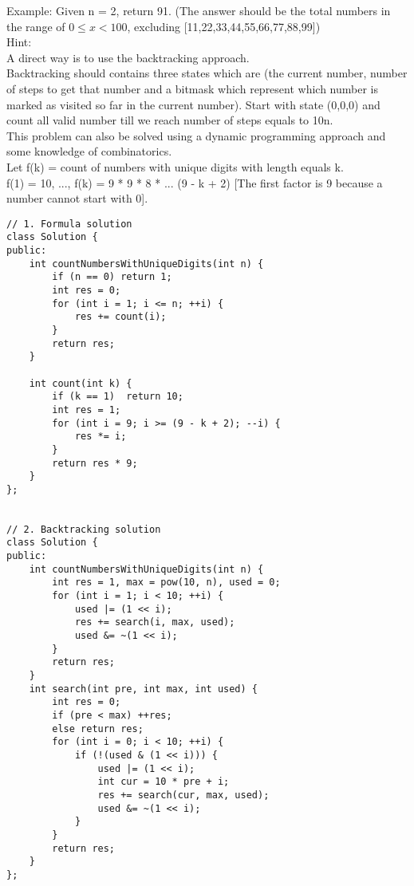Example:
Given n = 2, return 91. (The answer should be the total numbers in the range of $0 \leq x < 100$, excluding [11,22,33,44,55,66,77,88,99]) \\

Hint:\\
    A direct way is to use the backtracking approach.\\
    Backtracking should contains three states which are (the current number, number of steps to get that number and a bitmask which represent which number is marked as visited so far in the current number). Start with state (0,0,0) and count all valid number till we reach number of steps equals to 10n.\\
    This problem can also be solved using a dynamic programming approach and some knowledge of combinatorics.\\
    Let f(k) = count of numbers with unique digits with length equals k.\\
    f(1) = 10, ..., f(k) = 9 * 9 * 8 * ... (9 - k + 2) [The first factor is 9 because a number cannot start with 0].\\

\begin{lstlisting}
// 1. Formula solution
class Solution {
public:
    int countNumbersWithUniqueDigits(int n) {
        if (n == 0) return 1;
        int res = 0;
        for (int i = 1; i <= n; ++i) {
            res += count(i);
        }
        return res;
    }
    
    int count(int k) {
        if (k == 1)  return 10;
        int res = 1;
        for (int i = 9; i >= (9 - k + 2); --i) {
            res *= i;
        }
        return res * 9;
    }
};


// 2. Backtracking solution
class Solution {
public:
    int countNumbersWithUniqueDigits(int n) {
        int res = 1, max = pow(10, n), used = 0;
        for (int i = 1; i < 10; ++i) {
            used |= (1 << i);
            res += search(i, max, used);
            used &= ~(1 << i);
        }
        return res;
    }
    int search(int pre, int max, int used) {
        int res = 0;
        if (pre < max) ++res;
        else return res;
        for (int i = 0; i < 10; ++i) {
            if (!(used & (1 << i))) {
                used |= (1 << i);
                int cur = 10 * pre + i;
                res += search(cur, max, used);
                used &= ~(1 << i);
            }
        }
        return res;
    }
};
\end{lstlisting}


